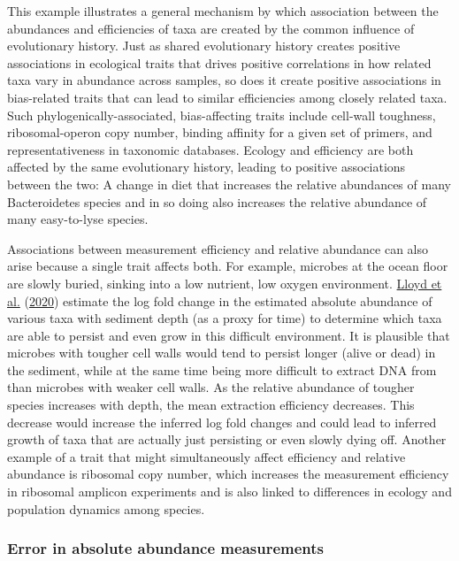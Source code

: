 \documentclass[
]{article}
\theoremstyle{definition}
\theoremstyle{definition}
\theoremstyle{definition}
\theoremstyle{definition}
\theoremstyle{remark}
\begin{document}
This example illustrates a general mechanism by which association between the abundances and efficiencies of taxa are created by the common influence of evolutionary history.
Just as shared evolutionary history creates positive associations in ecological traits that drives positive correlations in how related taxa vary in abundance across samples, so does it create positive associations in bias-related traits that can lead to similar efficiencies among closely related taxa.
Such phylogenically-associated, bias-affecting traits include cell-wall toughness, ribosomal-operon copy number, binding affinity for a given set of primers, and representativeness in taxonomic databases.
Ecology and efficiency are both affected by the same evolutionary history, leading to positive associations between the two: A change in diet that increases the relative abundances of many Bacteroidetes species and in so doing also increases the relative abundance of many easy-to-lyse species.

Associations between measurement efficiency and relative abundance can also arise because a single trait affects both.
For example, microbes at the ocean floor are slowly buried, sinking into a low nutrient, low oxygen environment.
\protect\hyperlink{ref-lloyd2020evid}{Lloyd et al.} (\protect\hyperlink{ref-lloyd2020evid}{2020}) estimate the log fold change in the estimated absolute abundance of various taxa with sediment depth (as a proxy for time) to determine which taxa are able to persist and even grow in this difficult environment.
It is plausible that microbes with tougher cell walls would tend to persist longer (alive or dead) in the sediment, while at the same time being more difficult to extract DNA from than microbes with weaker cell walls.
As the relative abundance of tougher species increases with depth, the mean extraction efficiency decreases.
This decrease would increase the inferred log fold changes and could lead to inferred growth of taxa that are actually just persisting or even slowly dying off.
Another example of a trait that might simultaneously affect efficiency and relative abundance is ribosomal copy number, which increases the measurement efficiency in ribosomal amplicon experiments and is also linked to differences in ecology and population dynamics among species.

\hypertarget{error-in-absolute-abundance-measurements}{%
\subsubsection{Error in absolute abundance measurements}\label{error-in-absolute-abundance-measurements}}
\end{document}
